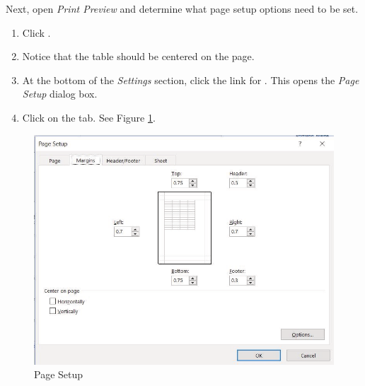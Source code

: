 Next, open \textit{Print Preview} and determine what page setup options need to be set.

\begin{enumerate}
	\item Click .
	\item Notice that the table should be centered on the page.
	\item At the bottom of the \textit{Settings} section, click the link for . This opens the \textit{Page Setup} dialog box. 
	\item Click on the  tab. See Figure \ref{05:fig26}.
\end{enumerate}

\begin{figure}[H]
	\centering
	\includegraphics[width=\maxwidth{.95\linewidth}]{gfx/ch05_fig26}
	\caption{Page Setup}
	\label{05:fig26}
\end{figure}

